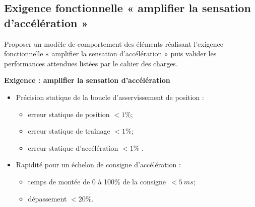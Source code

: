 \subsection*{Exigence fonctionnelle « amplifier la sensation
d'accélération »}
\ifprof
\else

\begin{obj}
Proposer un modèle de comportement des éléments réalisant l'exigence
fonctionnelle « amplifier la sensation d'accélération » puis valider les
performances attendues listées par le cahier des charges.
\end{obj}

\textbf{Exigence : amplifier la sensation d'accélération}
\begin{itemize}
\item  Précision statique de la boucle d'asservissement de position :
\begin{itemize}
\item erreur statique de position $<1\%$;
\item erreur statique de traînage $<1\%$; 
\item erreur statique d'accélération $<1\%$ .
\end{itemize}
\item Rapidité pour un échelon de consigne d'accélération :
\begin{itemize}
\item temps de montée de 0 à 100\% de la consigne~$<\SI{5}{ms}$;
\item dépassement $<20\%$.
\end{itemize}
\end{itemize}
\fi

